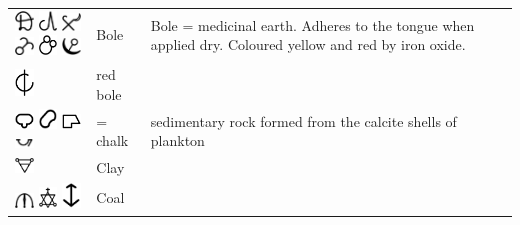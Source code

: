 \documentclass[british,final,landscape]{scrartcl}
\begin{document}
\begin{refsection}
\begin{supertabular}{p{0.3\textwidth}p{0.34\textwidth}p{0.34\textwidth}}
   \includegraphics[width=5mm]{Mineral/Bole} \includegraphics[width=5mm]{Mineral/Bole2} \includegraphics[width=5mm]{Mineral/Bole3} \includegraphics[width=5mm]{Mineral/Bole4} \includegraphics[width=5mm]{Mineral/Bole5} \includegraphics[width=5mm]{Mineral/Bole6} & Bole & Bole = medicinal earth. Adheres to the tongue when applied dry. Coloured yellow and red by iron oxide. \\
   \includegraphics[width=5mm]{Mineral/RedBole} & red bole & \\
   \includegraphics[width=5mm]{Mineral/Chalk} \includegraphics[width=5mm]{Mineral/Chalk2} \includegraphics[width=5mm]{Mineral/Chalk3} \includegraphics[width=5mm]{Mineral/Chalk4} &  = chalk & sedimentary rock formed from the calcite shells of plankton  \\
   \includegraphics[width=5mm]{Mineral/Clay} & Clay & \\
   \includegraphics[width=5mm]{Mineral/Coal} \includegraphics[width=5mm]{Mineral/Coal2} \includegraphics[width=5mm]{Mineral/Coal3} & Coal & \\

\end{supertabular}
\end{refsection}
\end{document}
